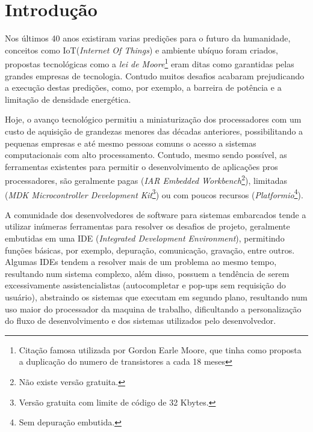 \chapter{Introdução}
Nos últimos 40 anos existiram varias predições para o futuro da humanidade, conceitos como IoT(\textit{Internet Of Things})\cite{gates1995estrada} e ambiente ubíquo\cite{weiser1991computer} foram criados, propostas tecnológicas como a \textit{lei de Moore}\footnote{Citação famosa utilizada por Gordon Earle Moore, que tinha como proposta a duplicação do numero de transistores a cada 18 meses} eram ditas como garantidas pelas grandes empresas de tecnologia. Contudo muitos desafios acabaram prejudicando a execução destas predições, como, por exemplo, a barreira de potência\cite{Patterson:2008:COD:1502247} e a limitação de densidade energética\cite{paradiso2005energy}.

Hoje, o avanço tecnológico permitiu a miniaturização dos processadores com um custo de aquisição de grandezas menores das décadas anteriores\cite{nordhaus2007two}, possibilitando a pequenas empresas e até mesmo pessoas comuns o acesso a sistemas computacionais com alto processamento. Contudo, mesmo	 sendo possível, as ferramentas existentes para permitir o desenvolvimento de aplicações pros processadores, são geralmente pagas (\textit{IAR Embedded Workbench}\footnote{Não existe versão gratuita\cite{buyiar}.}), limitadas (\textit{MDK Microcontroller Development Kit}\footnote{Versão gratuita com limite de código de 32 Kbytes.}) ou com poucos recursos (\textit{Platformio}\footnote{Sem depuração embutida.}).

A comunidade dos desenvolvedores de software para sistemas embarcados tende a utilizar inúmeras ferramentas para resolver os desafios de projeto, geralmente embutidas em uma IDE (\textit{Integrated Development Environment}), permitindo funções básicas, por exemplo, depuração, comunicação, gravação, entre outros. Algumas IDEs tendem a resolver mais de um problema ao mesmo tempo, resultando num sistema complexo, além disso, possuem a tendência de serem excessivamente assistencialistas (autocompletar e pop-ups sem requisição do usuário), abstraindo os sistemas que executam em segundo plano, resultando num uso maior do processador da maquina de trabalho, dificultando a personalização do fluxo de desenvolvimento e dos sistemas utilizados pelo desenvolvedor.

\iffalse
O intuito deste trabalho é a realização de um sistema para possibilitar aos desenvolvedores a programação de sistemas embarcados, sem a necessidade de utilizar sistemas assistencialistas que possam limitar a evolução do trabalho ou a utilização do produto final concebido.
\fi

